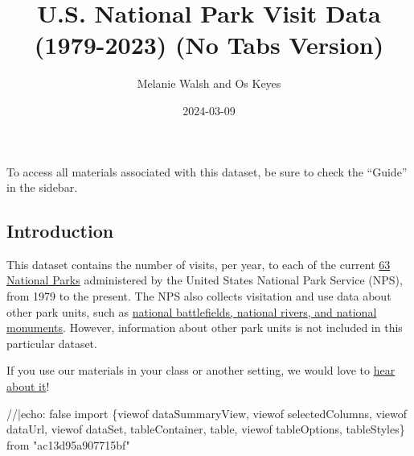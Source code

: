 \documentclass[
  letterpaper,
  DIV=11,
  numbers=noendperiod]{scrartcl}
\title{U.S. National Park Visit Data (1979-2023) (No Tabs Version)}
\author{Melanie Walsh and Os Keyes}
\date{2024-03-09}
\newenvironment{Shaded}{\begin{snugshade}}{\end{snugshade}}
\newcommand{\NormalTok}[1]{\textcolor[rgb]{0.00,0.23,0.31}{#1}}
\begin{document}
\maketitle

\begin{tcolorbox}[enhanced jigsaw, bottomrule=.15mm, colback=white, colbacktitle=quarto-callout-warning-color!10!white, coltitle=black, titlerule=0mm, leftrule=.75mm, toprule=.15mm, opacitybacktitle=0.6, colframe=quarto-callout-warning-color-frame, opacityback=0, rightrule=.15mm, breakable, bottomtitle=1mm, toptitle=1mm, title={Find All Materials in ``Guide''}, left=2mm, arc=.35mm]

To access all materials associated with this dataset, be sure to check
the ``Guide'' in the sidebar.

\end{tcolorbox}

\subsection{Introduction}\label{introduction}

This dataset contains the number of visits, per year, to each of the
current
\href{https://en.wikipedia.org/wiki/List_of_national_parks_of_the_United_States\#National_parks}{63
National Parks} administered by the United States National Park Service
(NPS), from 1979 to the present. The NPS also collects visitation and
use data about other park units, such as
\href{(https://www.nps.gov/aboutus/national-park-system.htm)}{national
battlefields, national rivers, and national monuments}. However,
information about other park units is not included in this particular
dataset.

\begin{tcolorbox}[enhanced jigsaw, bottomrule=.15mm, colback=white, colbacktitle=quarto-callout-tip-color!10!white, coltitle=black, titlerule=0mm, leftrule=.75mm, toprule=.15mm, opacitybacktitle=0.6, colframe=quarto-callout-tip-color-frame, opacityback=0, rightrule=.15mm, breakable, bottomtitle=1mm, toptitle=1mm, title={Brief Survey}, left=2mm, arc=.35mm]

If you use our materials in your class or another setting, we would love
to \href{https://forms.gle/yJpQscUH9k9Rn4Qy9}{hear about it}!

\end{tcolorbox}

\begin{Shaded}
\begin{Highlighting}[]
\NormalTok{//|echo: false}
\NormalTok{import \{viewof dataSummaryView, viewof selectedColumns, viewof dataUrl, viewof dataSet, tableContainer, table, viewof tableOptions, tableStyles\} from "ac13d95a907715bf"}
\end{Highlighting}
\end{Shaded}
\end{document}
